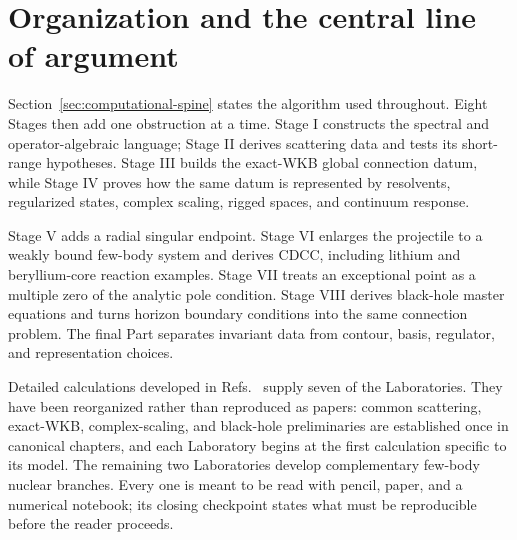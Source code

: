 \section{Organization and the central line of argument}
\label{subsec:organization}

Section~\ref{sec:computational-spine} states the algorithm used throughout.
Eight Stages then add one obstruction at a time.  Stage I constructs the
spectral and operator-algebraic language; Stage II derives scattering data
and tests its short-range hypotheses.  Stage III builds the exact-WKB global
connection datum, while Stage IV proves how the same datum is represented by
resolvents, regularized states, complex scaling, rigged spaces, and continuum
response.

Stage V adds a radial singular endpoint.  Stage VI enlarges the projectile to
a weakly bound few-body system and derives CDCC, including lithium and
beryllium-core reaction examples.  Stage VII treats an exceptional point as a
multiple zero of the analytic pole condition.  Stage VIII derives black-hole
master equations and turns horizon boundary conditions into the same
connection problem.  The final Part separates invariant data from contour,
basis, regulator, and representation choices.

Detailed calculations developed in Refs.~\cite{Morikawa:2025grx,
Morikawa:2025xjq,Morikawa:2025vvs,Morikawa:2025ezl,Morikawa:2025inx,
Ogawa:2026veu,Ogawa:2026dSCSM} supply seven of the Laboratories.  They have
been reorganized rather than reproduced as papers: common scattering,
exact-WKB, complex-scaling, and black-hole preliminaries are established once
in canonical chapters, and each Laboratory begins at the first calculation
specific to its model.  The remaining two Laboratories develop complementary
few-body nuclear branches.  Every one is meant to be read with pencil, paper,
and a numerical notebook; its closing checkpoint states what must be reproducible before the
reader proceeds.
